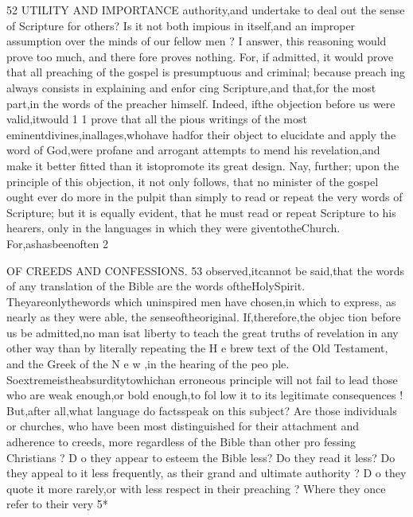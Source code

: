 \documentclass[
]{book}
\begin{document}
52 UTILITY AND IMPORTANCE
authority,and undertake to deal out the sense of Scripture for others? Is it not both impious
in itself,and an improper assumption over the minds of our fellow men ? I answer, this reasoning would prove too much, and there fore proves nothing. For, if admitted, it would prove that all preaching of the gospel
is presumptuous and criminal; because preach ing always consists in explaining and enfor cing Scripture,and that,for the most part,in the words of the preacher himself. Indeed, ifthe objection before us were valid,itwould
1 1
prove that all the pious writings of the most eminentdivines,inallages,whohave hadfor
their object to elucidate and apply the word of God,were profane and arrogant attempts to
mend his revelation,and make it better fitted than it istopromote its great design. Nay,
further; upon the principle of this objection, it not only follows, that no minister of the
gospel ought ever do more in the pulpit than simply to read or repeat the very words of Scripture; but it is equally evident, that he must read or repeat Scripture to his hearers, only in the languages in which they were giventotheChurch. For,ashasbeenoften
2

OF CREEDS AND CONFESSIONS. 53
observed,itcannot be said,that the words of any translation of the Bible are the words
oftheHolySpirit. Theyareonlythewords which uninspired men have chosen,in which to express, as nearly as they were able, the
senseoftheoriginal. If,therefore,the objec tion before us be admitted,no man isat liberty
to teach the great truths of revelation in any other way than by literally repeating the H e brew text of the Old Testament, and the Greek of the N e w ,in the hearing of the peo ple. Soextremeistheabsurditytowhichan erroneous principle will not fail to lead those who are weak enough,or bold enough,to fol low it to its legitimate consequences !
But,after all,what language do factsspeak on this subject? Are those individuals or churches, who have been most distinguished for their attachment and adherence to creeds, more regardless of the Bible than other pro fessing Christians ? D o they appear to esteem the Bible less? Do they read it less? Do they appeal to it less frequently, as their grand and ultimate authority ? D o they quote it more rarely,or with less respect in their preaching ? Where they once refer to their
very
5*
\end{document}
